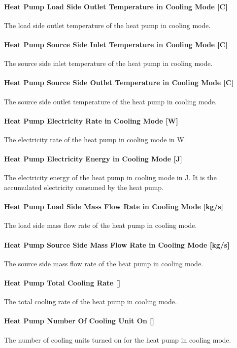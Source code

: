 \paragraph{Heat Pump Load Side Outlet Temperature in Cooling Mode {[}C{]}} The
load side outlet temperature of the heat pump in cooling mode.
\paragraph{Heat Pump Source Side Inlet Temperature in Cooling Mode {[}C{]}} The
source side inlet temperature of the heat pump in cooling mode.
\paragraph{Heat Pump Source Side Outlet Temperature in Cooling Mode {[}C{]}} The
source side outlet temperature of the heat pump in cooling mode.
\paragraph{Heat Pump Electricity Rate in Cooling Mode {[}W{]}} The electricity
rate of the heat pump in cooling mode in W.
\paragraph{Heat Pump Electricity Energy in Cooling Mode {[}J{]}} The electricity
energy of the heat pump in cooling mode in J. It is the accumulated electricity
consumed by the heat pump.
\paragraph{Heat Pump Load Side Mass Flow Rate in Cooling Mode {[}kg/s{]}} The
load side mass flow rate of the heat pump in cooling mode.
\paragraph{Heat Pump Source Side Mass Flow Rate in Cooling Mode {[}kg/s{]}} The
source side mass flow rate of the heat pump in cooling mode.
\paragraph{Heat Pump Total Cooling Rate {[}{]}} The total cooling rate of the
heat pump in cooling mode.
\paragraph{Heat Pump Number Of Cooling Unit On {[}{]}} The number of cooling
units turned on for the heat pump in cooling mode.
